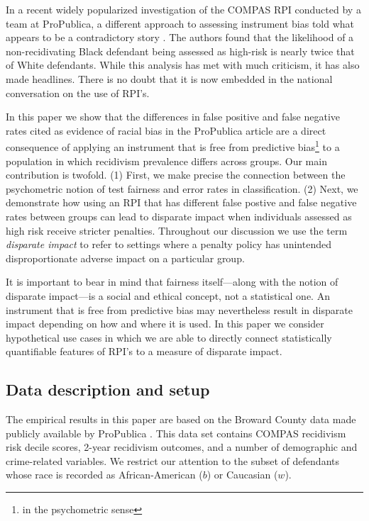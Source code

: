 \documentclass[11pt, svgnames, twocolumn]{article}
\numberwithin{equation}{section}
\theoremstyle{plain}
\theoremstyle{definition}
\numberwithin{theorem}{section}
\numberwithin{prop}{section}
\numberwithin{corollary}{section}
\numberwithin{definition}{section}
\begin{document}
In a recent widely popularized investigation of the COMPAS RPI conducted by a team at ProPublica, a different approach to assessing instrument bias told what appears to be a contradictory story \cite{propublica2016}.  The authors found that the likelihood of a non-recidivating Black defendant being assessed as high-risk is nearly twice that of White defendants.  While this analysis has met with much criticism, it has also made headlines. There is no doubt that it is now embedded in the national conversation on the use of RPI's.  


In this paper we show that the differences in false positive and false negative rates cited as evidence of racial bias in the ProPublica article are a direct consequence of applying an instrument that is free from predictive bias\footnote{in the psychometric sense} to a population in which recidivism prevalence differs across groups.   Our main contribution is twofold.  (1) First, we make precise the connection between the psychometric notion of test fairness and error rates in classification.  (2) Next, we demonstrate how using an RPI that has different false postive and false negative rates between groups can lead to disparate impact when individuals assessed as high risk receive stricter penalties.  Throughout our discussion we use the term \emph{disparate impact} to refer to settings where a penalty policy has unintended disproportionate adverse impact on a particular group.


It is important to bear in mind that fairness itself---along with the notion of disparate impact---is a social and ethical concept, not a statistical one.  An instrument that is free from predictive bias may nevertheless result in disparate impact depending on how and where it is used.  In this paper we consider hypothetical use cases in which we are able to directly connect statistically quantifiable features of RPI's to a measure of disparate impact.

\vspace{-0.25em}
\subsection{Data description and setup} \label{sec:intro_outline}

The empirical results in this paper are based on the Broward County data made publicly available by ProPublica \cite{propublica2016data}.  This data set contains COMPAS recidivism risk decile scores, 2-year recidivism outcomes, and a number of demographic and crime-related variables.    We restrict our attention to the subset of defendants whose race is recorded as African-American ($b$) or Caucasian ($w$). 
  
\end{document}
